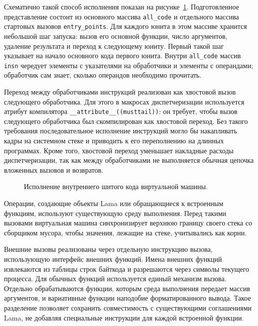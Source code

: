 Схематично такой способ исполнения показан на
рисунке~\ref{fig:internal-threaded-code}. Подготовленное представление состоит
из основного массива \verb=all_code= и отдельного массива стартовых вызовов
\verb=entry_points=. Для каждого юнита в этом массиве хранится небольшой шаг
запуска: вызов его основной функции, число аргументов, удаление результата и
переход к следующему юниту. Первый такой шаг указывает на начало основного
кода первого юнита. Внутри \verb=all_code= массив \verb=insn= чередует элементы с
указателями на обработчики и элементы с операндами; обработчик сам знает, сколько
операндов необходимо прочитать.

Переход между обработчиками инструкций реализован как хвостовой вызов
следующего обработчика. Для этого в макросах диспетчеризации используется
атрибут компилятора \verb=__attribute__((musttail))=: он требует, чтобы вызов
следующего обработчика был скомпилирован как хвостовой переход. Без такого
требования последовательное исполнение инструкций могло бы накапливать кадры
на системном стеке и приводить к его переполнению на длинных программах. Кроме
того, хвостовой переход уменьшает накладные расходы диспетчеризации, так как
между обработчиками не выполняется обычная цепочка вложенных вызовов и
возвратов.

\begin{figure}[H]
    \centering
    \resizebox{\textwidth}{!}{}
    \caption{Исполнение внутреннего шитого кода виртуальной машины.}
    \label{fig:internal-threaded-code}
\end{figure}

Операции, создающие объекты Lama или обращающиеся к встроенным функциям,
используют существующую среду выполнения. Перед такими вызовами виртуальная
машина синхронизирует верхнюю границу своего стека со сборщиком мусора, чтобы
значения, лежащие на стеке, учитывались как корни.

Внешние вызовы реализованы через отдельную инструкцию вызова, использующую интерфейс внешних
функций. Имена внешних функций извлекаются из таблицы строк байткода и разрешаются через символы
текущего процесса. Для обычных функций используется единый механизм вызова. Отдельно обрабатываются
функции, которым среда выполнения передает массив аргументов, и вариативные функции наподобие
форматированного вывода. Такое разделение позволяет сохранить совместимость с существующими
соглашениями Lama, не добавляя специальные инструкции для каждой встроенной функции.

